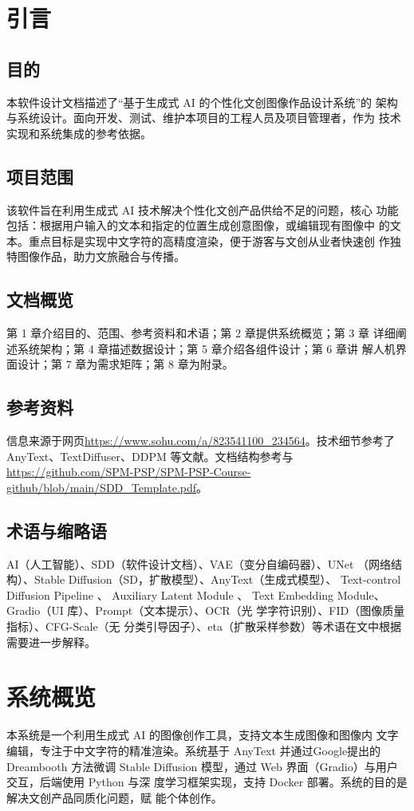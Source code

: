 \documentclass[a4paper,12pt]{article}
\begin{document}

\makecover

\tableofcontents
\clearpage

\section{引言}
\subsection{目的}
本软件设计文档描述了“基于生成式 AI 的个性化文创图像作品设计系统”的
架构与系统设计。面向开发、测试、维护本项目的工程人员及项目管理者，作为
技术实现和系统集成的参考依据。
\subsection{项目范围}
该软件旨在利用生成式 AI 技术解决个性化文创产品供给不足的问题，核心
功能包括：根据用户输入的文本和指定的位置生成创意图像，或编辑现有图像中
的文本。重点目标是实现中文字符的高精度渲染，便于游客与文创从业者快速创
作独特图像作品，助力文旅融合与传播。
\subsection{文档概览}
第 1 章介绍目的、范围、参考资料和术语；第 2 章提供系统概览；第 3 章
详细阐述系统架构；第 4 章描述数据设计；第 5 章介绍各组件设计；第 6 章讲
解人机界面设计；第 7 章为需求矩阵；第 8 章为附录。
\subsection{参考资料}
信息来源于网页\url{https://www.sohu.com/a/823541100_234564}。技术细节参考了
AnyText、TextDiffuser、DDPM 等文献。文档结构参考与\url{https://github.com/SPM-PSP/SPM-PSP-Course-github/blob/main/SDD_Template.pdf}。
\subsection{术语与缩略语}
AI（人工智能）、SDD（软件设计文档）、VAE（变分自编码器）、UNet
（网络结构）、Stable Diffusion（SD，扩散模型）、AnyText（生成式模型）、
Text-control Diffusion Pipeline 、 Auxiliary Latent Module 、 Text Embedding
Module、Gradio（UI 库）、Prompt（文本提示）、OCR（光
学字符识别）、FID（图像质量指标）、CFG-Scale（无
分类引导因子）、eta（扩散采样参数）等术语在文中根据需要进一步解释。

\section{系统概览}
本系统是一个利用生成式 AI 的图像创作工具，支持文本生成图像和图像内
文字编辑，专注于中文字符的精准渲染。系统基于 AnyText 并通过Google提出的Dreambooth
方法微调 Stable
Diffusion 模型，通过 Web 界面（Gradio）与用户交互，后端使用 Python 与深
度学习框架实现，支持 Docker 部署。系统的目的是解决文创产品同质化问题，赋
能个体创作。
\end{document}
